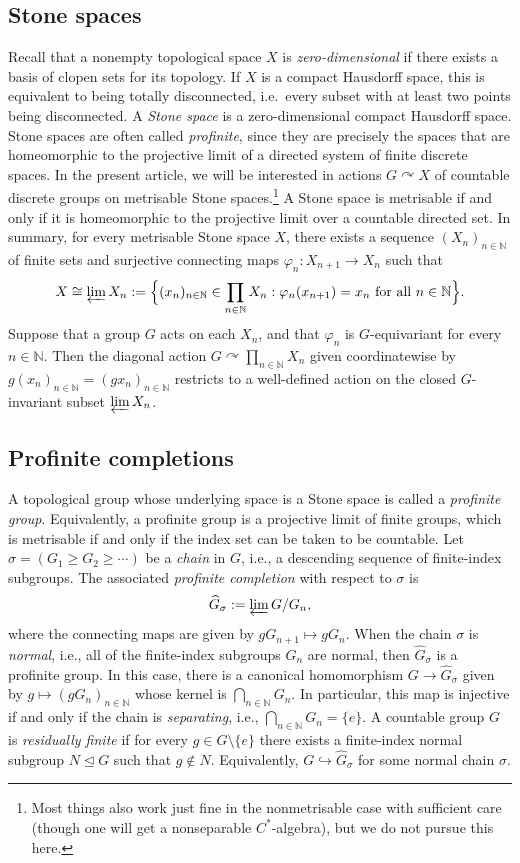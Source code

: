 \documentclass[11pt,a4,leqno]{amsart}
\theoremstyle{definition}
\theoremstyle{remark}
\numberwithin{equation}{section}
\theoremstyle{plain}
\newcommand{\Nb}{\mathbb{N}}
\begin{document}
\subsection{Stone spaces} Recall that a nonempty topological space $X$ is \emph{zero-dimensional} if there exists a basis of clopen sets for its topology. If $X$ is a compact Hausdorff space, this is equivalent to being totally disconnected, i.e.\ every subset with at least two points being disconnected. A \emph{Stone space} is a zero-dimensional compact Hausdorff space. Stone spaces are often called \emph{profinite}, since they are precisely the spaces that are homeomorphic to the projective limit of a directed system of finite discrete spaces. In the present article, we will be interested in actions $G\curvearrowright X$ of countable discrete groups on metrisable Stone spaces.\footnote{Most things also work just fine in the nonmetrisable case with sufficient care (though one will get a nonseparable $C^*$-algebra), but we do not pursue this here.} A Stone space is metrisable if and only if it is homeomorphic to the projective limit over a countable directed set. In summary, for every metrisable Stone space $X$, there exists a sequence $(X_n)_{n\in\Nb}$ of finite sets and surjective connecting maps $\varphi_n : X_{n+1} \to X_n$ such that
\[
    X \cong \varprojlim X_n := \Big\{ (x_n)_{n\in \Nb} \in \prod_{n\in \Nb} X_n : \varphi_n(x_{n+1}) = x_n \text{ for all } n \in \Nb\Big\}.
\]
Suppose that a group $G$ acts on each $X_n$, and that $\varphi_n$ is $G$-equivariant for every $n\in\Nb$. Then the diagonal action $G\curvearrowright \prod_{n\in\Nb} X_n$ given coordinatewise by $g (x_n)_{n\in \Nb} = (gx_n)_{n\in\Nb}$ restricts to a well-defined action on the closed $G$-invariant subset $\varprojlim X_n$.  

\subsection{Profinite completions} A topological group whose underlying space is a Stone space is called a \emph{profinite group}. Equivalently, a profinite group is a projective limit of finite groups, which is metrisable if and only if the index set can be taken to be countable. Let $\sigma = (G_1\ge G_2\ge \cdots)$ be a \emph{chain} in $G$, i.e., a descending sequence of finite-index subgroups. The associated \emph{profinite completion} with respect to $\sigma$ is 
\[
    \widehat{G}_\sigma := \varprojlim G/G_n,
\]
where the connecting maps are given by $gG_{n+1} \mapsto gG_n$. When the chain $\sigma$ is \emph{normal}, i.e., all of the finite-index subgroups $G_n$ are normal, then $\widehat{G}_\sigma$ is a profinite group. In this case, there is a canonical homomorphism $G \to \widehat{G}_\sigma$ given by $g\mapsto (gG_n)_{n\in \Nb}$ whose kernel is $\bigcap_{n\in \Nb} G_n$. In particular, this map is injective if and only if the chain is \emph{separating}, i.e., $\bigcap_{n\in \Nb} G_n = \{e\}$. A countable group $G$ is \emph{residually finite} if for every $g\in G\setminus \{e\}$ there exists a finite-index normal subgroup $N\unlhd G$ such that $g\not\in N$. Equivalently, $G \hookrightarrow \widehat{G}_\sigma$ for some normal chain $\sigma$.  
\end{document}
